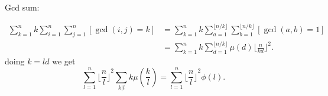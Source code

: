 Gcd sum:

\begin{align*}
        \sum_{k=1}^n k \sum_{i=1}^n \sum_{j=1}^n [\gcd(i,j)=k] &= \sum_{k=1}^n k \sum_{a=1}^{\lfloor n/k\rfloor}\sum_{b=1}^{\lfloor n/k \rfloor} [\gcd(a, b) = 1] \\
        &= \sum_{k=1}^n k \sum_{d=1}^{\lfloor n/k \rfloor} \mu(d) \lfloor \frac{n}{kd}\rfloor^2 .
\end{align*}
doing $k = ld$ we get
 \[\sum_{l=1}^n \lfloor{\frac{n}{l}\rfloor}^2 \sum_{k|l} k \mu(\frac{k}{l}) = \sum_{l=1}^n \lfloor{\frac{n}{l}\rfloor}^2 \phi(l).\]
 
     
    
    
